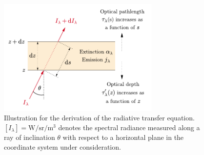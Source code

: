 \documentclass[a4paper,11pt]{report}
\begin{document}
\begin{figure}[h!]
\centering
\includegraphics[width=8cm]{figures/radiative-transfer-equation.pdf}
\caption{Illustration for the derivation of the radiative transfer equation. $[I_\lambda] = \si{\watt\per\steradian\per\cubic\meter}$ denotes the spectral radiance measured along a ray of inclination $\theta$ with respect to a horizontal plane in the coordinate system under consideration.}
\label{fig:radiative-transfer-equation}
\end{figure}
\end{document}

